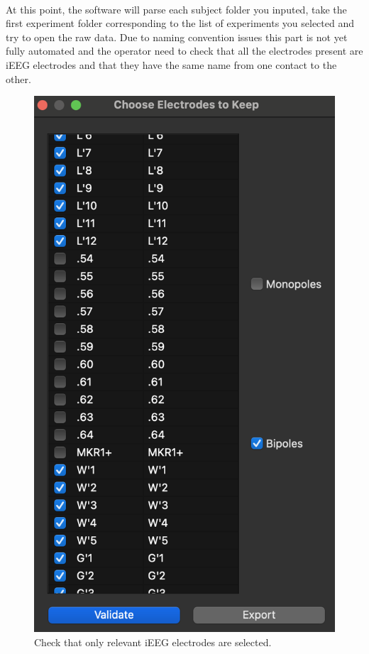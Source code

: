 \documentclass[a4paper]{article}
\begin{document}
\paragraph{} At this point, the software will parse each subject folder you inputed, take the first experiment folder corresponding to the list of experiments you selected and try to open the raw data. Due to naming convention issues this part is not yet fully automated and the operator need to check that all the electrodes present are iEEG electrodes and that they have the same name from one contact to the other. 
\begin{figure}[H]
\begin{center}
\includegraphics[scale=0.6]{ConnectCleanerMultiSubject.png}
\end{center}
\caption{\label{ConnectCleanerMultiSubUI}Check that only relevant iEEG electrodes are selected.}
\end{figure}
\end{document}
